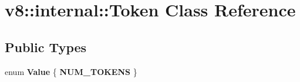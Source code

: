 \hypertarget{classv8_1_1internal_1_1_token}{}\section{v8\+:\+:internal\+:\+:Token Class Reference}
\label{classv8_1_1internal_1_1_token}
\subsection*{Public Types}
\begin{DoxyCompactItemize}
\item 
enum {\bfseries Value} \{ {\bfseries N\+U\+M\+\_\+\+T\+O\+K\+E\+NS}
 \}\hypertarget{classv8_1_1internal_1_1_token_aa1551a1c2dc217193f2f3cd063bc9555}{}\label{classv8_1_1internal_1_1_token_aa1551a1c2dc217193f2f3cd063bc9555}

\end{DoxyCompactItemize}
